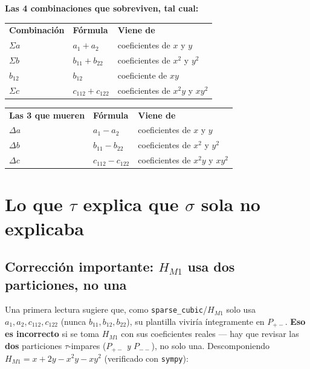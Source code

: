 \documentclass[11pt, a4paper]{article}
\newcommand{\TH}[1]{\cellcolor{cTHbg}\color{white}\textbf{#1}}
\begin{document}
\begin{tcolorbox}[defbox]
\textbf{Las 4 combinaciones que sobreviven, tal cual:}
\begin{center}
\begin{tabular}{lll}
  \TH{Combinaci\'on} & \TH{F\'ormula} & \TH{Viene de} \\[1pt]
  $\Sigma a$ & $a_1+a_2$       & coeficientes de $x$ y $y$ \\
  $\Sigma b$ & $b_{11}+b_{22}$ & coeficientes de $x^2$ y $y^2$ \\
  $b_{12}$   & $b_{12}$        & coeficiente de $xy$ \\
  $\Sigma c$ & $c_{112}+c_{122}$ & coeficientes de $x^2y$ y $xy^2$ \\
\end{tabular}
\end{center}
\end{tcolorbox}

\begin{center}
\begin{tabular}{lll}
  \TH{Las 3 que mueren} & \TH{F\'ormula} & \TH{Viene de} \\[1pt]
  $\Delta a$ & $a_1-a_2$       & coeficientes de $x$ y $y$ \\
  $\Delta b$ & $b_{11}-b_{22}$ & coeficientes de $x^2$ y $y^2$ \\
  $\Delta c$ & $c_{112}-c_{122}$ & coeficientes de $x^2y$ y $xy^2$ \\
\end{tabular}
\end{center}

\section{Lo que $\tau$ explica que $\sigma$ sola no explicaba}
\label{sec:paraque2}

\subsection{Correcci\'on importante: $H_{M1}$ usa \textbf{dos} particiones, no una}

Una primera lectura sugiere que, como \texttt{sparse\_cubic}/$H_{M1}$
solo usa $a_1,a_2,c_{112},c_{122}$ (nunca $b_{11},b_{12},b_{22}$), su
plantilla vivir\'ia \'integramente en $P_{+-}$. \textbf{Eso es
incorrecto} si se toma $H_{M1}$ con sus coeficientes reales
--- hay que revisar las \textbf{dos} particiones $\tau$-impares
($P_{+-}$ \emph{y} $P_{--}$), no solo una. Descomponiendo
$H_{M1}=x+2y-x^2y-xy^2$ (verificado con \texttt{sympy}):
\end{document}
